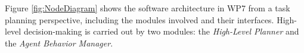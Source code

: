
Figure \ref{fig:NodeDiagram} shows the software architecture in WP7 from a task planning perspective, including the modules involved and their interfaces. High-level decision-making is carried out by two modules: the \textit{High-Level Planner} and the \textit{Agent Behavior Manager}. 

